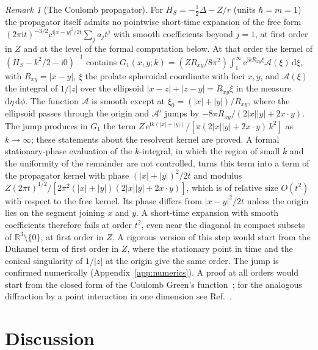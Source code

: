 \documentclass[%
 aip,
 jmp,
 amsmath,amssymb,
 reprint, onecolumn
]{revtex4-1}
\theoremstyle{definition}
\theoremstyle{remark}
\newtheorem{remark}{Remark}
\newcommand{\R}{\mathbb{R}}
\newcommand{\rmd}{\mathrm{d}}
\newcommand{\rmi}{\mathrm{i}}
\newcommand{\rme}{\mathrm{e}}
\begin{document}
\begin{remark}[The Coulomb propagator]\label{rem:coulomb}
For $H_S=-\frac12\Delta-Z/r$ (units $\hbar=m=1$) the propagator itself
admits no pointwise short-time expansion of the free form
$(2\pi\rmi t)^{-3/2}\rme^{\rmi|x-y|^2/2t}\sum_ja_jt^j$ with smooth
coefficients beyond $j=1$, at first order in $Z$ and at the level of the
formal computation below. At that order the kernel of
$(H_S-k^2/2-\rmi0)^{-1}$ contains
$G_1(x,y;k)=(ZR_{xy}/8\pi^2)\int_1^\infty\rme^{\rmi kR_{xy}\xi}
\mathcal{A}(\xi)\,\rmd\xi$, with $R_{xy}=|x-y|$, $\xi$ the prolate spheroidal coordinate with
foci $x,y$, and $\mathcal{A}(\xi)$ the integral of $1/|z|$ over the
ellipsoid $|x-z|+|z-y|=R_{xy}\xi$ in the measure $\rmd\eta\,\rmd\phi$. The
function $\mathcal{A}$ is smooth except at $\xi_0=(|x|+|y|)/R_{xy}$,
where the ellipsoid passes through the origin and $\mathcal{A}'$ jumps
by $-8\pi R_{xy}/(2|x||y|+2x\cdot y)$. The jump produces in $G_1$ the
term $Z\,\rme^{\rmi k(|x|+|y|)}/[\pi(2|x||y|+2x\cdot y)\,k^2]$ as
$k\to\infty$; these statements about the resolvent kernel are proved.
A formal stationary-phase evaluation of the $k$-integral, in which the
region of small $k$ and the uniformity of the remainder are not
controlled, turns this term into a term of the propagator kernel with
phase $(|x|+|y|)^2/2t$ and modulus
$Z(2\pi t)^{1/2}/[2\pi^2(|x|+|y|)(2|x||y|+2x\cdot y)]$, which is of
relative size $O(t^2)$ with respect to the free kernel. Its phase
differs from $|x-y|^2/2t$ unless the origin lies on the segment joining
$x$ and $y$. A short-time expansion with smooth coefficients therefore
fails at order $t^2$, even near the diagonal in compact subsets of
$\R^3\setminus\{0\}$, at first order in $Z$. A rigorous version of this
step would start from the Duhamel term of first order in $Z$, where the
stationary point in time and the conical singularity of $1/|z|$ at the
origin give the same order. The jump is confirmed
numerically (Appendix~\ref{app:numerics}). A proof at all orders would
start from the closed form of the Coulomb Green's
function~\cite{Hostler1964}; for the analogous diffraction by a point
interaction in one dimension see Ref.~.
\end{remark}

\section{Discussion}\label{sec:discussion}
\end{document}
